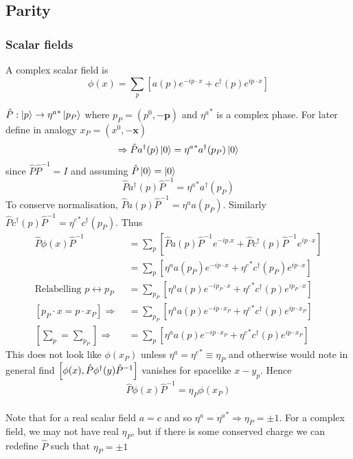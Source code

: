 \documentclass{article}
\begin{document}
\subsection{Parity}

\subsubsection*{Scalar fields}
\begin{definition}
A complex scalar field is 
\[
\phi(x) = \sum_p \left[ a(p) e^{-ip\cdot x} + c^\dagger(p) e^{ip\cdot x} \right]
\]
\end{definition}
$\hat{P}: \ket{p} \to {\eta^a}^\ast \ket{p_P}$ where $p_P = (p^0,-\bm{p})$ and ${\eta^a}^\ast$ is a complex phase. For later define in analogy $x_P = (x^0, -\bm{x})$
\[
\Rightarrow \hat{P} a^\dagger (p) \ket{0} = {\eta^a}^\ast a^\dagger (p_P) \ket{0}
\]
since $\hat{P}\hat{P}^{-1}=I$ and assuming $\hat{P}\ket{0}=\ket{0}$
\[
\hat{P} a^\dagger (p) \hat{P}^{-1} = {\eta^a}^\ast a^\dagger (p_P)
\]
To conserve normalisation, $\hat{P} a(p) \hat{P}^{-1} = \eta^{a} a(p_P)$. Similarly $\hat{P} c^\dagger(p) \hat{P}^{-1} = {\eta^c}^\ast c^\dagger(p_P)$. Thus 
\begin{align*}
\hat{P} \phi(x) \hat{P}^{-1} &= \sum_p \left[ \hat{P} a(p) \hat{P}^{-1} e^{-ip.x} + \hat{P} c^\dagger(p) \hat{P}^{-1} e^{ip\cdot x} \right] \\ 
&= \sum_p \left[ \eta^a a(p_P) e^{-ip\cdot x} + {\eta^c}^\ast c^\dagger(p_P) e^{ip\cdot x} \right] \\
\text{Relabelling $p \leftrightarrow p_P$ } &= \sum_{p_P} \left[ \eta^a a(p) e^{-ip_P\cdot x} + {\eta^c}^\ast c^\dagger(p) e^{ip_P \cdot x} \right] \\
[p_P \cdot x = p\cdot x_P] \Rightarrow &= \sum_{p_P} \left[ \eta^a a(p) e^{-ip\cdot x_P} + {\eta^c}^\ast c^\dagger(p) e^{ip \cdot x_P} \right]  \\
[\sum_p = \sum_{p_P}] \Rightarrow &= \sum_{p} \left[ \eta^a a(p) e^{-ip\cdot x_P} + {\eta^c}^\ast c^\dagger(p) e^{ip \cdot x_P} \right] 
\end{align*}
This does not look like $\phi(x_P)$ unless $\eta^a = {\eta^c}^\ast \equiv \eta_P$ and otherwise would note in general find $\comm[\phi(x)]{\hat{P}\phi^\dagger(y) \hat{P}^{-1}}$ vanishes for spacelike $x-y_p$. Hence
\[
\hat{P} \phi(x) \hat{P}^{-1} = \eta_P \phi(x_P)
\]
\\
Note that for a real scalar field $a=c$ and so $\eta^a = {\eta^a}^\ast \Rightarrow \eta_P = \pm 1$. For a complex field, we may not have real $\eta_P$, but if there is some conserved charge we can redefine $\hat{P}$ such that $\eta_P = \pm1$
\end{document}
